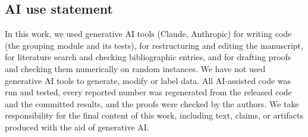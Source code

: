\subsection*{AI use statement}

In this work, we used generative AI tools (Claude, Anthropic) for writing code (the
grouping module and its tests), for restructuring and
editing the manuscript, for literature search and checking bibliographic entries, and
for drafting proofs and checking them numerically on random instances.  We have not
used generative AI tools to generate, modify or label data.  All AI-assisted code was
run and tested, every reported number was regenerated from the released code and the
committed results, and the proofs were checked by the authors.  We take responsibility
for the final content of this work, including text, claims, or artifacts produced with
the aid of generative AI.
